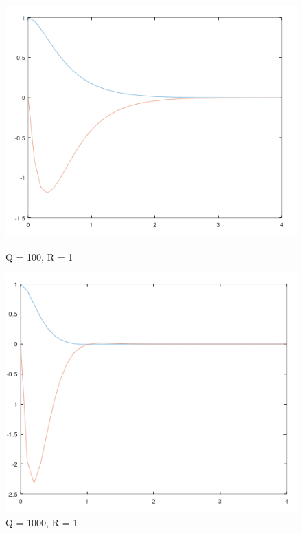 \documentclass{jsarticle}
\begin{document}
\begin{figure}[h!]
  \centering
  \begin{minipage}{0.325\linewidth}
    \centering
    \includegraphics[width=\linewidth]{./fig/q100_r1.png}
    \caption{Q = 100, R = 1}
  \end{minipage}
  \hfill
  \begin{minipage}{0.325\linewidth}
    \centering
    \includegraphics[width=\linewidth]{./fig/q1000_r1.png}
    \caption{Q = 1000, R = 1}
  \end{minipage}
  \hfill
  \begin{minipage}{0.325\linewidth}

\end{minipage}
\end{figure}
\end{document}
